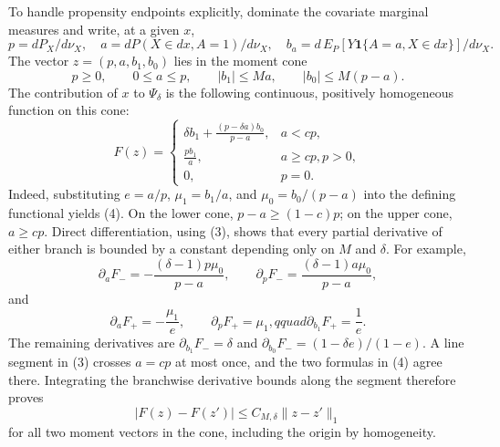 To handle propensity endpoints explicitly, dominate the covariate marginal measures and write, at a given \(x\),
\begin{equation}
 p=dP_X/d\nu_X,\quad a=dP(X\in dx,A=1)/d\nu_X,\quad
 b_a=d\,E_P[Y\mathbf 1\{A=a,X\in dx\}]/d\nu_X.
\end{equation}
The vector \(z=(p,a,b_1,b_0)\) lies in the moment cone
\begin{equation}
 p\ge0,\qquad 0\le a\le p,\qquad |b_1|\le Ma,\qquad |b_0|\le M(p-a).                    \tag{3}
\end{equation}
The contribution of \(x\) to \(\Psi_\delta\) is the following continuous, positively homogeneous function on this cone:
\begin{equation}
 F(z)=
 \begin{cases}
 \displaystyle \delta b_1+\frac{(p-\delta a)b_0}{p-a},&a<cp,\\[6pt]
 \displaystyle \frac{pb_1}{a},&a\ge cp, p>0,\\[4pt]
 0,&p=0.
 \end{cases}                                                                            \tag{4}
\end{equation}
Indeed, substituting \(e=a/p\), \(\mu _1=b_1/a\), and \(\mu _0=b_0/(p-a)\) into the defining functional yields (4).  On the lower cone, \(p-a\ge(1-c)p\); on the upper cone, \(a\ge cp\).  Direct differentiation, using (3), shows that every partial derivative of either branch is bounded by a constant depending only on \(M\) and \(\delta\).  For example,
\begin{equation}
 \partial_aF_-=-\frac{(\delta-1)p\mu _0}{p-a},\qquad
 \partial_pF_-=\frac{(\delta-1)a\mu _0}{p-a},
\end{equation}
and
\begin{equation}
 \partial_aF_+=-\frac{\mu _1}{e},\qquad \partial_pF_+=\mu _1,qquad
 \partial_{b_1}F_+=\frac1e.
\end{equation}
The remaining derivatives are \(\partial_{b_1}F_-=\delta\) and
\(\partial_{b_0}F_-=(1-\delta e)/(1-e)\).  A line segment in (3) crosses \(a=cp\) at most once, and the two formulas in (4) agree there.  Integrating the branchwise derivative bounds along the segment therefore proves
\begin{equation}
 |F(z)-F(z')|\le C_{M,\delta}\|z-z'\|_1                                                 \tag{5}
\end{equation}
for all two moment vectors in the cone, including the origin by homogeneity.

